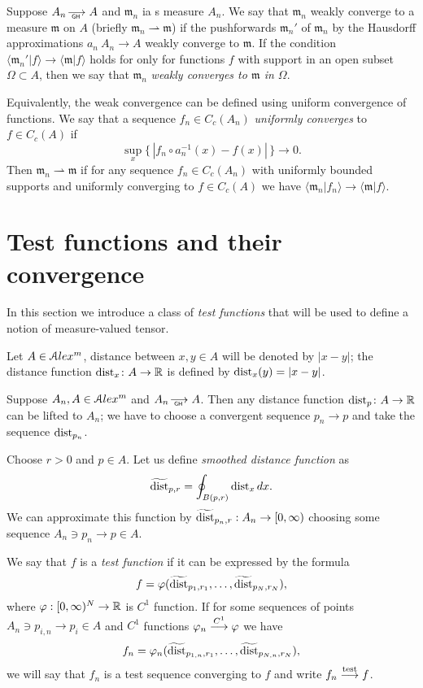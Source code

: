 Suppose $A_n\GHto A$ and $\mathfrak m_n$ ia s measure $A_n$.
We say that $\mathfrak m_n$ weakly converge to a measure $\mathfrak m$ on $A$ (briefly $\mathfrak m_n\rightharpoonup \mathfrak m$) if the pushforwards $\mathfrak m_n'$ of $\mathfrak m_n$  by the Hausdorff approximations $a_n\:A_n\to A$ weakly converge to 
$\mathfrak m$.
If the condition $\langle \mathfrak m_n'|f\rangle \to \langle \mathfrak m|f\rangle $ holds for only for functions $f$ with support in an open subset $\Omega\subset A$, then we say that $\mathfrak m_n$ \emph{weakly converges to $\mathfrak m$ in $\Omega$}.

Equivalently, the weak convergence can be defined using uniform convergence of functions.
We say that  a sequence $f_n\in C_c(A_n)$
\emph{uniformly converges} to $f\in C_c(A)$
if 
\[\sup_x\{\,|f_n\circ a_n^{-1}(x)-f(x)|\,\}\to 0.\]
Then  $\mathfrak m_n\rightharpoonup \mathfrak m$
if for any sequence $f_n\in C_c(A_n)$
with uniformly bounded supports and
uniformly converging to $f\in C_c(A)$
we have $\langle \mathfrak m_n|f_n\rangle \to \langle \mathfrak m|f\rangle $.


\section{Test functions and their convergence}

In this section we introduce a class of \emph{test functions} that will be used to define  a notion of measure-valued tensor.

Let $A\in \mathcal{A}lex^m$, distance between $x,y\in A$ will be denoted by $|x-y|$;
the distance function $\operatorname{\rm dist}_x\colon A\to \mathbb{R}$ is defined by $\operatorname{\rm dist}_x(y)=|x-y|$.

Suppose $A_n, A\in \mathcal{A}lex^m$ and  $A_n\GHto A$.
Then any distance function $\operatorname{\rm dist}_p\colon A\to\mathbb{R}$ can be lifted to $A_n$;
we have to choose a convergent sequence $p_n\to p$ and take the
sequence $\operatorname{\rm dist}_{p_n}$.

Choose $r>0$ and $p\in A$.
Let us define \emph{smoothed distance function} as 
$$\widetilde{\operatorname{\rm dist}}_{p,r} =\oint_{B(p,r)} \operatorname{\rm dist}_{x}dx.$$ 
We can approximate this function by
$\widetilde{\operatorname{\rm dist}}_{p_n,r}:A_n\to [0,\infty)$
choosing some  sequence $A_n\ni p_n\to p\in A$.

We say that $f$ is a \emph{test function} if it can be expressed by the formula
$$f=\varphi( \widetilde{\operatorname{\rm dist}}_{p_1,r_1}, \dots,   \widetilde{\operatorname{\rm dist}}_{p_N,r_N}),$$
where $\varphi:[0,\infty)^N\to\mathbb{R}$ is  $C^1$ function.
If for some sequences of points $A_n\ni p_{i,n}\to p_i\in A$
and $C^1$ functions   
$\varphi_n\stackrel{C^1}{\longrightarrow} \varphi$ we have
$$f_n=\varphi_n( \widetilde{\operatorname{\rm dist}}_{p_{1,n},r_1},\dots,   \widetilde{\operatorname{\rm dist}}_{p_{N,n},r_N}),$$
we will say that $f_n$ is a test sequence converging to $f$ and write $f_n\stackrel{\tiny\rm test}{\longrightarrow} f$.

